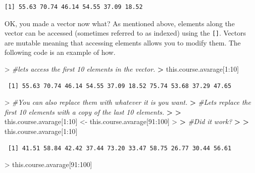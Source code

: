 \documentclass[
]{book}
\newenvironment{Shaded}{\begin{snugshade}}{\end{snugshade}}
\newcommand{\CommentTok}[1]{\textcolor[rgb]{0.56,0.35,0.01}{\textit{#1}}}
\newcommand{\DecValTok}[1]{\textcolor[rgb]{0.00,0.00,0.81}{#1}}
\newcommand{\ErrorTok}[1]{\textcolor[rgb]{0.64,0.00,0.00}{\textbf{#1}}}
\newcommand{\NormalTok}[1]{#1}
\newcommand{\OtherTok}[1]{\textcolor[rgb]{0.56,0.35,0.01}{#1}}
\newcommand{\SpecialCharTok}[1]{\textcolor[rgb]{0.00,0.00,0.00}{#1}}
\theoremstyle{definition}
\theoremstyle{definition}
\theoremstyle{definition}
\theoremstyle{definition}
\theoremstyle{remark}
\begin{document}
\begin{verbatim}
[1] 55.63 70.74 46.14 54.55 37.09 18.52
\end{verbatim}

OK, you made a vector now what?
As mentioned above, elements along the vector can be accessed (sometimes referred to as indexed) using the \texttt{{[}{]}}.
Vectors are mutable meaning that accessing elements allows you to modify them.
The following code is an example of how.

\begin{Shaded}
\begin{Highlighting}[]
\SpecialCharTok{\textgreater{}} \CommentTok{\#let\textquotesingle{}s access the first 10 elements in the vector.}
\ErrorTok{\textgreater{}}\NormalTok{ this.course.avarage[}\DecValTok{1}\SpecialCharTok{:}\DecValTok{10}\NormalTok{]}
\end{Highlighting}
\end{Shaded}

\begin{verbatim}
 [1] 55.63 70.74 46.14 54.55 37.09 18.52 75.74 53.68 37.29 47.65
\end{verbatim}

\begin{Shaded}
\begin{Highlighting}[]
\SpecialCharTok{\textgreater{}} \CommentTok{\#You can also replace them with whatever it is you want. }
\ErrorTok{\textgreater{}} \CommentTok{\#Let\textquotesingle{}s replace the first 10 elements with a copy of the last 10 elements.}
\ErrorTok{\textgreater{}} 
\ErrorTok{\textgreater{}}\NormalTok{ this.course.avarage[}\DecValTok{1}\SpecialCharTok{:}\DecValTok{10}\NormalTok{] }\OtherTok{\textless{}{-}}\NormalTok{ this.course.avarage[}\DecValTok{91}\SpecialCharTok{:}\DecValTok{100}\NormalTok{]}
\SpecialCharTok{\textgreater{}} 
\ErrorTok{\textgreater{}} \CommentTok{\#Did it work?}
\ErrorTok{\textgreater{}} 
\ErrorTok{\textgreater{}}\NormalTok{ this.course.avarage[}\DecValTok{1}\SpecialCharTok{:}\DecValTok{10}\NormalTok{]}
\end{Highlighting}
\end{Shaded}

\begin{verbatim}
 [1] 41.51 58.84 42.42 37.44 73.20 33.47 58.75 26.77 30.44 56.61
\end{verbatim}

\begin{Shaded}
\begin{Highlighting}[]
\SpecialCharTok{\textgreater{}}\NormalTok{ this.course.avarage[}\DecValTok{91}\SpecialCharTok{:}\DecValTok{100}\NormalTok{]}
\end{Highlighting}
\end{Shaded}
\end{document}
